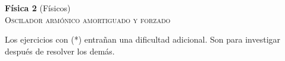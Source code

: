 \documentclass[11pt,spanish,a4paper]{article}
\begin{document}
\begin{center}
\textbf{Física 2} (Físicos) \hfill {}\\
\textsc{\LARGE Oscilador armónico amortiguado y forzado}\\
\end{center}

Los ejercicios con (*) entrañan una dificultad adicional. Son para investigar después de resolver los demás.


\begin{enumerate}







\end{enumerate}
\end{document}
